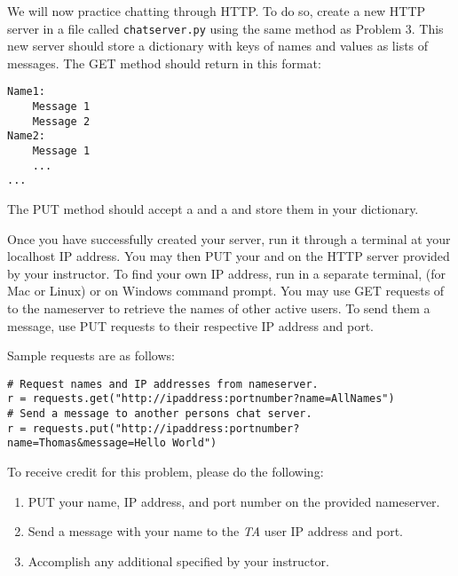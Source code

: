 \begin{problem}
We will now practice chatting through HTTP.
To do so, create a new HTTP server in a file called \texttt{chatserver.py} using the same method as Problem 3. %
This new server should store a dictionary with keys of names and values as lists of messages.
The GET method should return in this format:
\begin{lstlisting}
Name1:
	Message 1
	Message 2
Name2:
	Message 1
	...
...
\end{lstlisting}
The PUT method should accept a  and a  and store them in your dictionary.

Once you have successfully created your server, run it through a terminal at your localhost IP address.
You may then PUT your  and  on the HTTP server provided by your instructor.
To find your own IP address, run in a separate terminal,  (for Mac or Linux) or  on Windows command prompt.
You may use GET requests of  to the nameserver to retrieve the names of other active users.
To send them a message, use PUT requests to their respective IP address and port.

Sample requests are as follows:

\begin{lstlisting}
# Request names and IP addresses from nameserver.
r = requests.get("http://ipaddress:portnumber?name=AllNames")
# Send a message to another persons chat server.
r = requests.put("http://ipaddress:portnumber?name=Thomas&message=Hello World")
\end{lstlisting}


To receive credit for this problem, please do the following:
\begin{enumerate}
\item PUT your name, IP address, and port number on the provided nameserver.
\item Send a message with your name to the \emph{TA} user IP address and port.
\item Accomplish any additional specified by your instructor.
\end{enumerate}


\end{problem}
